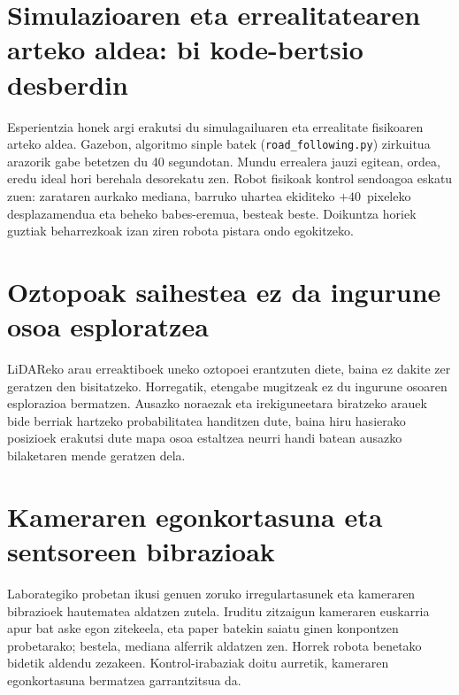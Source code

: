\section[Simulazioaren eta errealitatearen arteko aldea: bi kode-bertsio desberdin][Simulazioaren eta errealitatearen aldea]{Simulazioaren eta errealitatearen arteko aldea: bi kode-bertsio desberdin}

Esperientzia honek argi erakutsi du simulagailuaren eta errealitate fisikoaren arteko aldea. Gazebon, algoritmo sinple batek (\texttt{road\_following.py}) zirkuitua arazorik gabe betetzen du 40 segundotan. Mundu errealera jauzi egitean, ordea, eredu ideal hori berehala desorekatu zen. Robot fisikoak kontrol sendoagoa eskatu zuen: zarataren aurkako mediana, barruko uhartea ekiditeko $+40$~pixeleko desplazamendua eta beheko babes-eremua, besteak beste. Doikuntza horiek guztiak beharrezkoak izan ziren robota pistara ondo egokitzeko.

\section[Oztopoak saihestea ez da ingurune osoa esploratzea][Oztopoak saihestea eta esplorazioa]{Oztopoak saihestea ez da ingurune osoa esploratzea}

LiDAReko arau erreaktiboek uneko oztopoei erantzuten diete, baina ez dakite zer geratzen den bisitatzeko. Horregatik, etengabe mugitzeak ez du ingurune osoaren esplorazioa bermatzen. Ausazko noraezak eta irekiguneetara biratzeko arauek bide berriak hartzeko probabilitatea handitzen dute, baina hiru hasierako posizioek erakutsi dute mapa osoa estaltzea neurri handi batean ausazko bilaketaren mende geratzen dela.

\section[Kameraren egonkortasuna eta sentsoreen bibrazioak][Kamera eta sentsoreen bibrazioak]{Kameraren egonkortasuna eta sentsoreen bibrazioak}

Laborategiko probetan ikusi genuen zoruko irregulartasunek eta kameraren bibrazioek hautematea aldatzen zutela. Iruditu zitzaigun kameraren euskarria apur bat aske egon zitekeela, eta paper batekin saiatu ginen konpontzen probetarako; bestela, mediana alferrik aldatzen zen. Horrek robota benetako bidetik aldendu zezakeen. Kontrol-irabaziak doitu aurretik, kameraren egonkortasuna bermatzea garrantzitsua da.

